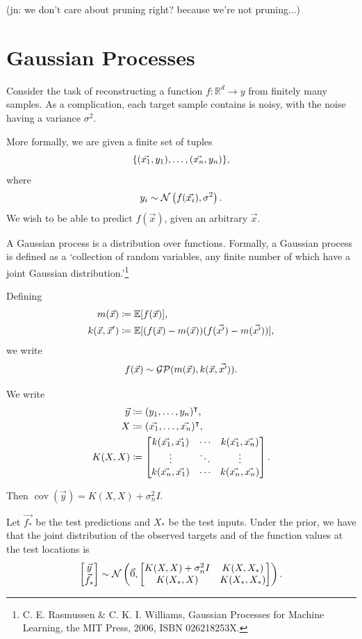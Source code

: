\documentclass[11pt,twoside]{report}
\newcommand\bbE{\mathbb{E}}
\newcommand\bbR{\mathbb{R}}
\newcommand\cG{\mathcal{G}}
\newcommand\cN{\mathcal{N}}
\newcommand\cP{\mathcal{P}}
\DeclareMathOperator{\cov}{cov}
\newcommand\jn[1]{{\color{red}(jn: #1)}}
\begin{document}
\jn{we don't care about pruning right? because we're not pruning...}

\section{Gaussian Processes}
Consider the task of reconstructing a function $f: \bbR^d \to y$ from finitely many samples. As a complication, each target sample contains is noisy, with the noise having a variance $\sigma^2$.

More formally, we are given a finite set of tuples\[
    \{ (\vec{x_1}, y_1), \dots, (\vec{x_n}, y_n) \}\text,
\] where \[
    y_i \sim \cN\left(f(\vec{x_i}), \sigma^2\right)\text.
\] We wish to be able to predict $f(\vec{x})$, given an arbitrary $\vec{x}$.

A Gaussian process is a distribution over functions. Formally, a Gaussian process is defined as a `collection of random variables, any finite number of which have a joint Gaussian distribution.'\footnote{C. E. Rasmussen \& C. K. I. Williams, Gaussian Processes for Machine Learning, the MIT Press, 2006, ISBN 026218253X.}

Defining \begin{align*}
    m(\vec{x}) &\coloneqq \bbE[f(\vec{x})] \text, \\
    k(\vec{x}, \vec{x}') &\coloneqq \bbE[(f(\vec{x}) - m(\vec{x}))(f(\vec{x'}) - m(\vec{x'}))],
\end{align*} we write \[
    f(\vec{x}) \sim \cG\cP(m(\vec{x}), k(\vec{x}, \vec{x'}))\text.
\]

We write \begin{align*}
    \vec y &\coloneqq (y_1, \dots, y_n)^\intercal \text, \\
    X &\coloneqq (\vec{x_1}, \dots, \vec{x_n})^\intercal \text, \\
    K(X, X) &\coloneqq \begin{bmatrix}
        k(\vec{x_1}, \vec{x_1}) & \cdots & k(\vec{x_1}, \vec{x_n}) \\
        \vdots & \ddots & \vdots \\
        k(\vec{x_n}, \vec{x_1}) & \cdots & k(\vec{x_n}, \vec{x_n})
    \end{bmatrix}\text.
\end{align*}

Then $\cov(\vec{y}) = K(X, X) + \sigma_n^2I$.

Let $\vec{f_*}$ be the test predictions and $X_*$ be the test inputs. Under the prior, we have that the joint distribution of the observed targets and of the function values at the test locations is \[
    \begin{bmatrix}
        \vec{y} \\ \vec{f_*}
    \end{bmatrix} \sim \cN\left(\vec0, \begin{bmatrix}
        K(X, X) + \sigma_n^2I & K(X, X_*) \\
        K(X_*, X) & K(X_*, X_*)
    \end{bmatrix}\right)\text.
\]
\end{document}
